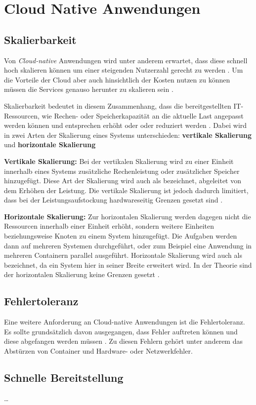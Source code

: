 \section{Cloud Native Anwendungen}
\label{sec:cloud-native-anwendungen}

\subsection{Skalierbarkeit}
Von \textit{Cloud-native} Anwendungen wird unter anderem erwartet, dass diese schnell hoch skalieren können um einer steigenden Nutzerzahl gerecht zu werden \cite[Vgl.][S. 1ff]{Armbrust2009} \cite[Vgl.][S. 234]{Villamizar2017}. Um die Vorteile der Cloud aber auch hinsichtlich der Kosten nutzen zu können müssen die Services genauso herunter zu skalieren sein \cite[Vgl.][S. 884]{Adzic2017}.

Skalierbarkeit bedeutet in diesem Zusammenhang, dass die bereitgestellten IT-Ressourcen, wie Rechen- oder Speicherkapazität an die aktuelle Last angepasst werden können und entsprechen erhöht oder oder reduziert werden \cite[Vgl.][S. 15]{Reinheimer2018}\cite[Vgl.][]{Geißler2019}. Dabei wird in zwei Arten der Skalierung eines Systems unterschieden: \textbf{vertikale Skalierung} und \textbf{horizontale Skalierung} \cite[Vgl.][]{Geißler2019}

\textbf{Vertikale Skalierung:}
Bei der vertikalen Skalierung wird zu einer Einheit innerhalb eines Systems zusätzliche Rechenleistung oder zusätzlicher Speicher hinzugefügt. Diese Art der Skalierung wird auch als \grqq{} bezeichnet, abgeleitet von dem Erhöhen der Leistung. Die vertikale Skalierung ist jedoch dadurch limitiert, dass bei der Leistungsaufstockung hardwareseitig Grenzen gesetzt sind \cite[Vgl.][]{Geißler2019}.

\textbf{Horizontale Skalierung:}
Zur horizontalen Skalierung werden dagegen nicht die Ressourcen innerhalb einer Einheit erhöht, sondern weitere Einheiten beziehungsweise Knoten zu einem System hinzugefügt. Die Aufgaben werden dann auf mehreren Systemen durchgeführt, oder zum Beispiel eine Anwendung in mehreren Containern parallel ausgeführt. Horizontale Skalierung wird auch als \grqq{} bezeichnet, da ein System hier in seiner Breite erweitert wird. In der Theorie sind der horizontalen Skalierung keine Grenzen gesetzt \cite[Vgl.][]{Geißler2019}.

\subsection{Fehlertoleranz}
Eine weitere Anforderung an Cloud-native Anwendungen ist die Fehlertoleranz. Es sollte grundsätzlich davon ausgegangen, dass Fehler auftreten können und diese abgefangen werden müssen \cite[Vgl.][S. 17]{Gannon2017}. Zu diesen Fehlern gehört unter anderem das Abstürzen von Container und Hardware- oder Netzwerkfehler.

\subsection{Schnelle Bereitstellung}
\dots
\pagebreak